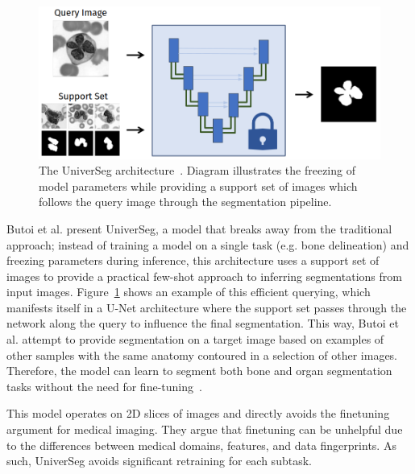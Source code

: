 \documentclass[11pt,twoside]{report}
\begin{document}
\begin{figure}[H]
  \centering
  \includegraphics[width=.5\linewidth]{../figures/universeg.png}
  \caption{The UniverSeg architecture~\cite{universeg}. Diagram illustrates the freezing of model parameters while providing a support set of images which follows the query image through the segmentation pipeline.}\label{fig:universeg}
\end{figure}

Butoi et al. present UniverSeg, a model that breaks away from the traditional approach; instead of training a model on a single task (e.g. bone delineation) and freezing parameters during inference, this architecture uses a support set of images to provide a practical few-shot approach to inferring segmentations from input images. Figure~\ref{fig:universeg} shows an example of this efficient querying, which manifests itself in a U-Net architecture where the support set passes through the network along the query to influence the final segmentation. This way, Butoi et al. attempt to provide segmentation on a target image based on examples of other samples with the same anatomy contoured in a selection of other images. Therefore, the model can learn to segment both bone and organ segmentation tasks without the need for fine-tuning~\cite{universeg}.

This model operates on 2D slices of images and directly avoids the finetuning argument for medical imaging. They argue that finetuning can be unhelpful due to the differences between medical domains, features, and data fingerprints. As such, UniverSeg avoids significant retraining for each subtask.



\end{document}
